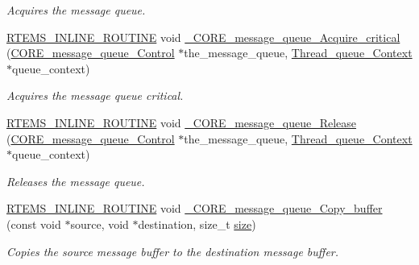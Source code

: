 \begin{DoxyCompactItemize}
\begin{DoxyCompactList}\small\item\em Acquires the message queue. \end{DoxyCompactList}\item 
\mbox{\hyperlink{group__RTEMSScoreBaseDefs_gac216239df231d5dbd15e3520b0b9313f}{R\+T\+E\+M\+S\+\_\+\+I\+N\+L\+I\+N\+E\+\_\+\+R\+O\+U\+T\+I\+NE}} void \mbox{\hyperlink{group__RTEMSScoreMessageQueue_ga589be0ab807a01d3d55e6be17a1f708f}{\+\_\+\+C\+O\+R\+E\+\_\+message\+\_\+queue\+\_\+\+Acquire\+\_\+critical}} (\mbox{\hyperlink{structCORE__message__queue__Control}{C\+O\+R\+E\+\_\+message\+\_\+queue\+\_\+\+Control}} $\ast$the\+\_\+message\+\_\+queue, \mbox{\hyperlink{structThread__queue__Context}{Thread\+\_\+queue\+\_\+\+Context}} $\ast$queue\+\_\+context)
\begin{DoxyCompactList}\small\item\em Acquires the message queue critical. \end{DoxyCompactList}\item 
\mbox{\hyperlink{group__RTEMSScoreBaseDefs_gac216239df231d5dbd15e3520b0b9313f}{R\+T\+E\+M\+S\+\_\+\+I\+N\+L\+I\+N\+E\+\_\+\+R\+O\+U\+T\+I\+NE}} void \mbox{\hyperlink{group__RTEMSScoreMessageQueue_gabb2d48506286ad10b4bbdd3684dcb924}{\+\_\+\+C\+O\+R\+E\+\_\+message\+\_\+queue\+\_\+\+Release}} (\mbox{\hyperlink{structCORE__message__queue__Control}{C\+O\+R\+E\+\_\+message\+\_\+queue\+\_\+\+Control}} $\ast$the\+\_\+message\+\_\+queue, \mbox{\hyperlink{structThread__queue__Context}{Thread\+\_\+queue\+\_\+\+Context}} $\ast$queue\+\_\+context)
\begin{DoxyCompactList}\small\item\em Releases the message queue. \end{DoxyCompactList}\item 
\mbox{\hyperlink{group__RTEMSScoreBaseDefs_gac216239df231d5dbd15e3520b0b9313f}{R\+T\+E\+M\+S\+\_\+\+I\+N\+L\+I\+N\+E\+\_\+\+R\+O\+U\+T\+I\+NE}} void \mbox{\hyperlink{group__RTEMSScoreMessageQueue_gac4393bd0fea722792b78b1a17cbf5766}{\+\_\+\+C\+O\+R\+E\+\_\+message\+\_\+queue\+\_\+\+Copy\+\_\+buffer}} (const void $\ast$source, void $\ast$destination, size\+\_\+t \mbox{\hyperlink{sun4u_2tte_8h_a245260f6f74972558f61b85227df5aae}{size}})
\begin{DoxyCompactList}\small\item\em Copies the source message buffer to the destination message buffer. \end{DoxyCompactList}\item 

\end{DoxyCompactItemize}
